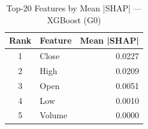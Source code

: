 \begin{table}[htbp]
\centering
\caption{Top-20 Features by Mean |SHAP| — XGBoost (G0)}
\label{tab:fi_XGBoost_G0}
\begin{tabular}{clr}
\toprule
Rank & Feature & Mean |SHAP| \\
\midrule
1 & Close & 0.0227 \\
2 & High & 0.0209 \\
3 & Open & 0.0051 \\
4 & Low & 0.0010 \\
5 & Volume & 0.0000 \\
\bottomrule
\end{tabular}
\end{table}